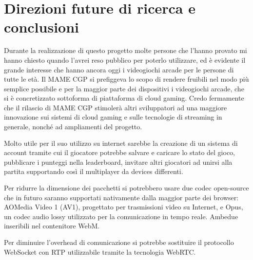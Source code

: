 %
%

\chapter*{Direzioni future di ricerca e conclusioni}


Durante la realizzazione di questo progetto molte persone che l'hanno provato mi hanno chiesto quando l'avrei reso pubblico per poterlo utilizzare, ed è evidente il grande interesse che hanno ancora oggi i videogiochi arcade per le persone di tutte le età. Il MAME CGP si prefiggeva lo scopo di rendere fruibili nel modo più semplice possibile e per la maggior parte dei dispositivi i videogiochi arcade, che si è concretizzato sottoforma di piattaforma di cloud gaming. Credo fermamente che il rilascio di MAME CGP stimolerà altri sviluppatori ad una maggiore innovazione sui sistemi di cloud gaming e sulle tecnologie di streaming in generale, nonché ad ampliamenti del progetto. 

Molto utile per il suo utilizzo su internet sarebbe la creazione di un sistema di account tramite cui il giocatore potrebbe salvare e caricare lo stato del gioco, pubblicare i punteggi nella leaderboard, invitare altri giocatori ad unirsi alla partita supportando così il multiplayer da devices differenti.

Per ridurre la dimensione dei pacchetti si potrebbero usare due codec open-source che in futuro saranno supportati nativamente dalla maggior parte dei browser: AOMedia Video 1 (AV1), progettato per trasmissioni video su Internet, e Opus, un codec audio lossy utilizzato per la comunicazione in tempo reale. Ambedue inseribili nel contenitore WebM.

Per diminuire l'overhead di comunicazione si potrebbe sostituire il protocollo WebSocket con RTP utilizzabile tramite la tecnologia WebRTC.

